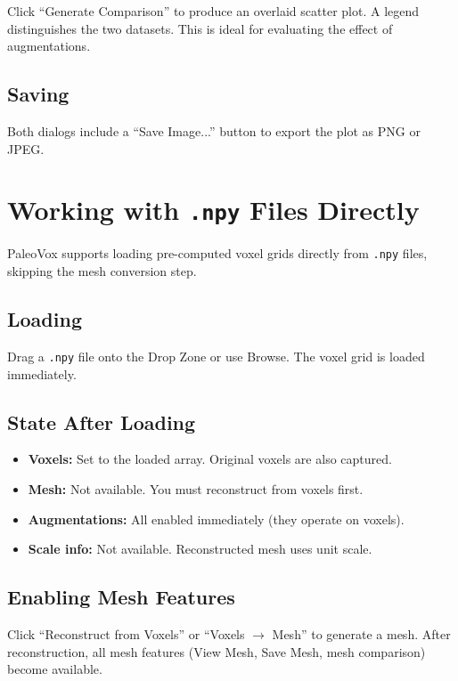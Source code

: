 \documentclass[12pt,a4paper]{article}
\begin{document}
Click ``Generate Comparison'' to produce an overlaid scatter plot. A legend distinguishes the two datasets. This is ideal for evaluating the effect of augmentations.

\subsection{Saving}

Both dialogs include a ``Save Image...'' button to export the plot as PNG or JPEG.

\section{Working with \texttt{.npy} Files Directly}

PaleoVox supports loading pre-computed voxel grids directly from \texttt{.npy} files, skipping the mesh conversion step.

\subsection{Loading}
Drag a \texttt{.npy} file onto the Drop Zone or use Browse. The voxel grid is loaded immediately.

\subsection{State After Loading}
\begin{itemize}
  \item \textbf{Voxels:} Set to the loaded array. Original voxels are also captured.
  \item \textbf{Mesh:} Not available. You must reconstruct from voxels first.
  \item \textbf{Augmentations:} All enabled immediately (they operate on voxels).
  \item \textbf{Scale info:} Not available. Reconstructed mesh uses unit scale.
\end{itemize}

\subsection{Enabling Mesh Features}
Click ``Reconstruct from Voxels'' or ``Voxels $\rightarrow$ Mesh'' to generate a mesh. After reconstruction, all mesh features (View Mesh, Save Mesh, mesh comparison) become available.
\end{document}
